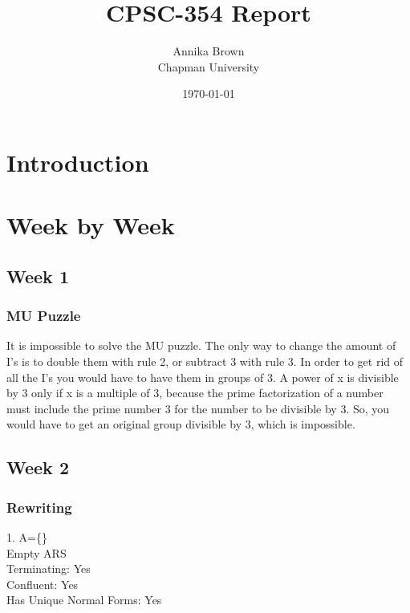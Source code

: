 \documentclass{article}
\title{CPSC-354 Report}
\author{Annika Brown  \\ Chapman University}
\date{\today}
\theoremstyle{theorem}
\theoremstyle{definition}
\theoremstyle{remark}
\begin{document}
\maketitle

\begin{abstract}
\end{abstract}

\setcounter{tocdepth}{3}
\tableofcontents

\section{Introduction}\label{intro}

\section{Week by Week}\label{homework}

\subsection{Week 1}

\subsubsection{MU Puzzle}

It is impossible to solve the MU puzzle. The only way to change the amount of I’s is to double them with rule 2, or subtract 3 with rule 3. In order to get rid of all the I’s you would have to have them in groups of 3. A power of x is divisible by 3 only if x is a multiple of 3, because the prime factorization of a number must include the prime number 3 for the number to be divisible by 3. So, you would have to get an original group divisible by 3, which is impossible.

\subsection{Week 2}

\subsubsection{Rewriting}

1. \quad A=\{\}\\
Empty ARS\\
Terminating: Yes\\
Confluent: Yes\\
Has Unique Normal Forms: Yes
\end{document}
